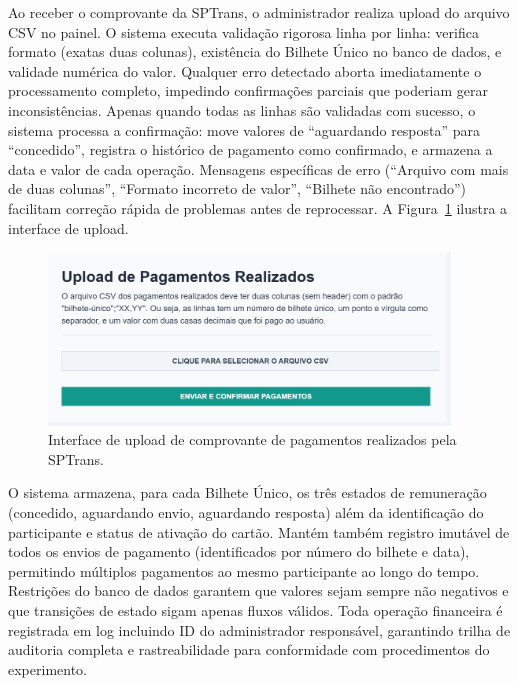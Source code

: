 Ao receber o comprovante da SPTrans,
o administrador realiza upload do arquivo CSV no painel. O sistema executa validação
rigorosa linha por linha: verifica formato (exatas duas colunas), existência do
Bilhete Único no banco de dados, e validade numérica do valor. Qualquer erro
detectado aborta imediatamente o processamento completo, impedindo confirmações
parciais que poderiam gerar inconsistências. Apenas quando todas as linhas são
validadas com sucesso, o sistema processa a confirmação: move valores de
``aguardando resposta'' para ``concedido'', registra o histórico de pagamento como confirmado, e armazena a data e valor de cada operação. Mensagens específicas de erro (``Arquivo com
mais de duas colunas'', ``Formato incorreto de valor'', ``Bilhete não encontrado'')
facilitam correção rápida de problemas antes de reprocessar. A Figura~\ref{fig:remuneracao_gerar_csv_form_processados} ilustra a interface de upload.

\begin{figure}[htb]
    \centering
    \includegraphics[width=0.95\textwidth]{figuras/remuneracao_processados.png}
    \caption{Interface de upload de comprovante de pagamentos realizados pela SPTrans.}
    \label{fig:remuneracao_gerar_csv_form_processados}
  \end{figure}
O sistema armazena, para cada Bilhete Único, os três estados de remuneração (concedido, aguardando envio, aguardando resposta) além da identificação do participante e status de ativação do cartão. Mantém também registro imutável de todos os envios de pagamento (identificados por número do bilhete e data), permitindo múltiplos pagamentos ao mesmo participante ao longo do tempo. Restrições do banco de dados garantem que valores sejam sempre não
negativos e que transições de estado sigam apenas fluxos
válidos. Toda operação financeira é registrada em log incluindo ID do administrador
responsável, garantindo trilha de auditoria completa e rastreabilidade para
conformidade com procedimentos do experimento.

